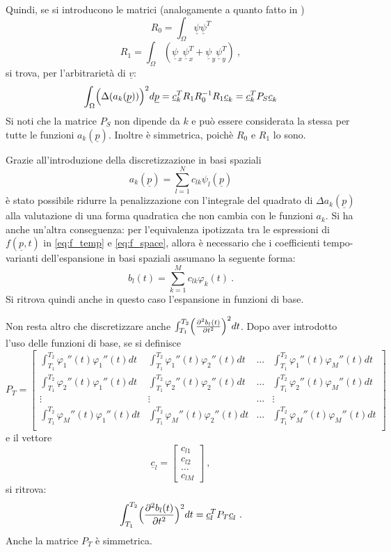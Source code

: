 \documentclass[a4paper,11pt,twoside,openright]{book}							%
\begin{document}
Quindi, se si introducono le matrici (analogamente a quanto fatto in \cite{art:sangalli})
$$ R_0 = \int_\Omega \underline \psi \underline \psi^T $$
$$ R_1 = \int_\Omega (\underline \psi_x \underline \psi_x^T + \underline \psi_y \underline \psi_y^T) \ ,$$
si trova, per l'arbitrarietà di $\underline v$:
\begin{equation}
\label{eq:pspace}
\int_{\Omega} \Bigl( \Delta(  a_k(\underline p)  ) \Bigr)^2 d \underline p = \underline{c}_k^T R_1 R_0^{-1} R_1 \underline{c}_k=\underline{c}_k^T P_S \underline{c}_k
\end{equation}
Si noti che la matrice $P_S$ non dipende da $k$ e può essere considerata la stessa per tutte le funzioni $a_k(\underline{p})$. Inoltre è simmetrica, poichè $R_0$ e $R_1$ lo sono.

Grazie all'introduzione della discretizzazione in basi spaziali
$$
a_k(\underline p)=\sum_{l=1}^N c_{lk}\psi_l(\underline p)
$$
è stato possibile ridurre la penalizzazione con l'integrale del quadrato di $\Delta a_k(\underline p)$
alla valutazione di una forma quadratica che non cambia con le funzioni $a_k$. Si ha anche un'altra conseguenza: per l'equivalenza ipotizzata tra le espressioni di $f(\underline{p},t)$ in \ref{eq:f_temp} e \ref{eq:f_space}, allora è necessario che i coefficienti tempo-varianti dell'espansione in basi spaziali assumano la seguente forma:
$$
b_l(t)=\sum_{k=1}^M c_{lk}\varphi_k(t) \ .
$$
Si ritrova quindi anche in questo caso l'espansione in funzioni di base.

Non resta altro che discretizzare anche $\int_{T_1}^{T_2} \Bigl( \frac{\partial^2   b_l(t)   }{\partial t ^2} \Bigr)^2 dt$. Dopo aver introdotto l'uso delle funzioni di base, se si definisce 
 $$ P_T = \begin{bmatrix}
\int_{T_1}^{T_2} \varphi_1''(t) \varphi_1''(t) dt  & \int_{T_1}^{T_2} \varphi_1''(t) \varphi_2''(t) dt & \hdots & \int_{T_1}^{T_2} \varphi_1''(t) \varphi_M''(t) dt  \\
\int_{T_1}^{T_2} \varphi_2''(t) \varphi_1''(t) dt  & \int_{T_1}^{T_2} \varphi_2''(t) \varphi_2''(t) dt & \hdots & \int_{T_1}^{T_2} \varphi_2''(t) \varphi_M''(t) dt  \\
\vdots & \vdots & \hdots & \vdots \\
\int_{T_1}^{T_2} \varphi_M''(t) \varphi_1''(t) dt  & \int_{T_1}^{T_2} \varphi_M''(t) \varphi_2''(t) dt & \hdots & \int_{T_1}^{T_2} \varphi_M''(t) \varphi_M''(t) dt  \\
\end{bmatrix} $$
e il vettore $$
\underline{c}_l =
\begin{bmatrix}
c_{l1} \\ c_{l2} \\ \hdots \\ c_{lM}
\end{bmatrix} \ ,$$ si ritrova:
$$
\int_{T_1}^{T_2} \Bigl( \frac{\partial^2   b_l(t)   }{\partial t ^2} \Bigr)^2 dt = \underline{c}_l^T  P_T \underline{c}_l \ .
$$
Anche la matrice $P_T$ è simmetrica.
\end{document}
